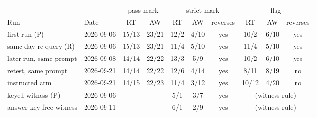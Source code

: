 \begingroup\scriptsize\setlength{\tabcolsep}{4pt}
\begin{tabular}{@{}llcccccccc@{}}
\toprule
 & & \multicolumn{2}{c}{pass mark} & \multicolumn{3}{c}{strict mark} & \multicolumn{3}{c}{flag} \\
\cmidrule(lr){3-4}\cmidrule(lr){5-7}\cmidrule(l){8-10}
Run & Date & RT & AW & RT & AW & reverses & RT & AW & reverses \\
\midrule
first run (P) & 2026-09-06 & 15/13 & 23/21 & 12/2 & 4/10 & yes & 10/2 & 6/10 & yes \\
same-day re-query (R) & 2026-09-06 & 15/13 & 23/21 & 11/4 & 5/10 & yes & 11/4 & 5/10 & yes \\
later run, same prompt & 2026-09-08 & 14/14 & 22/22 & 13/3 & 5/9 & yes & 10/2 & 6/10 & yes \\
retest, same prompt & 2026-09-21 & 14/14 & 22/22 & 12/6 & 4/14 & yes & 8/11 & 8/19 & no \\
instructed arm & 2026-09-21 & 14/15 & 22/23 & 11/4 & 3/12 & yes & 10/12 & 4/20 & no \\
keyed witness (P) & 2026-09-06 & \multicolumn{2}{c}{} & 5/1 & 3/7 & yes & \multicolumn{3}{c}{(witness rule)} \\
answer-key-free witness & 2026-09-11 & \multicolumn{2}{c}{} & 6/1 & 2/9 & yes & \multicolumn{3}{c}{(witness rule)} \\
\bottomrule
\end{tabular}
\endgroup
